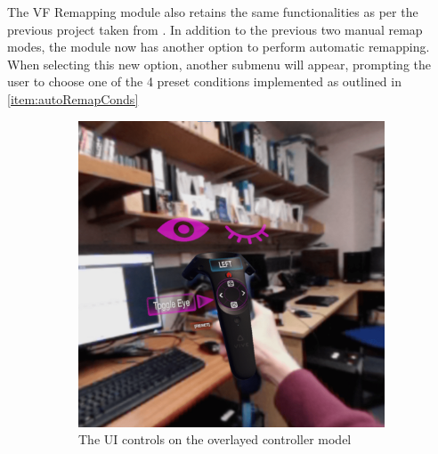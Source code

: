 \documentclass{l4proj}
\begin{document}
The VF Remapping module also retains the same functionalities as per the previous project taken from \cite{Russell2023}. In addition to the previous two manual remap modes, the module now has another option to perform automatic remapping. When selecting this new option, another submenu will appear, prompting the user to choose one of the 4 preset conditions implemented as outlined in \autoref{item:autoRemapConds}

\begin{figure}[!h]
    \centering
    
    \begin{subfigure}[b]{0.4\textwidth}
        \includegraphics[width=\linewidth]{images/VRView_VFR-RemapMode_sq.png}
        \caption{The UI controls on the overlayed controller model}
        \label{fig:controller}
    \end{subfigure}
    \hfill
    \begin{subfigure}[b]{0.4\textwidth}

\end{subfigure}
\end{figure}
\end{document}

